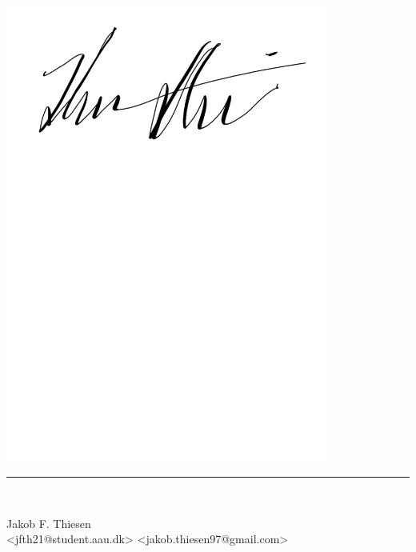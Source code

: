\begin{minipage}[b]{0.45\textwidth}
 \centering
 {
 \includegraphics[clip, trim=0 575 0 0, width=0.8\textwidth]{Formalia/Figures/JakSig.pdf}
 \rule{\textwidth}{0.5pt}\\}
 Jakob F. Thiesen\\
 {\footnotesize <jfth21@student.aau.dk>}
 {\footnotesize <jakob.thiesen97@gmail.com>}
\end{minipage}
